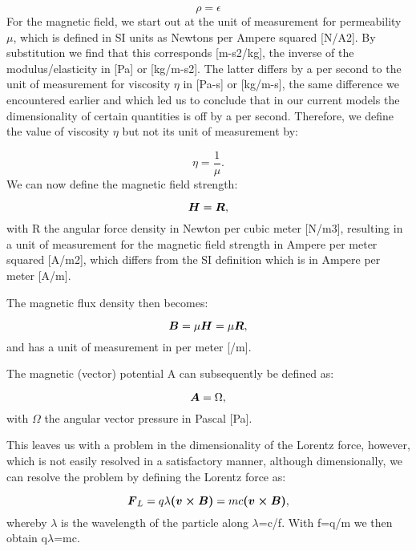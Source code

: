 \documentclass{article}
\newcommand\boldsubformula[1]{\text{\mathversion{bold}$#1$}}
\begin{document}
\begin{equation}
\rho =\epsilon 
\end{equation}
For the magnetic field, we start out at the unit of measurement for permeability $\mu $, which is defined in SI units as
Newtons per Ampere squared [N/A2]. By substitution we find that this corresponds [m-s2/kg], the inverse of the
modulus/elasticity in [Pa] or [kg/m-s2]. The latter differs by a per second to the unit of measurement for viscosity
$\eta $ in [Pa-s] or [kg/m-s], the same difference we encountered earlier and which led us to conclude that in our
current models the dimensionality of certain quantities is off by a per second. Therefore, we define the value of
viscosity $\eta $ but not its unit of measurement by:

\begin{equation}
\eta =\frac 1{\mu }.
\end{equation}
We can now define the magnetic field strength:

\begin{equation}
\boldsubformula H=\boldsubformula R,
\end{equation}
with R the angular force density in Newton per cubic meter [N/m3], resulting in a unit of measurement for the magnetic
field strength in Ampere per meter squared [A/m2], which differs from the SI definition which is in Ampere per meter
[A/m]. 

The magnetic flux density then becomes:

\begin{equation}
\boldsubformula B=\mu \boldsubformula H=\mu \boldsubformula R,
\end{equation}
and has a unit of measurement in per meter [/m].

The magnetic (vector) potential A can subsequently be defined as:

\begin{equation}
\boldsubformula A=\Omega ,
\end{equation}
with $\Omega $ the angular vector pressure in Pascal [Pa].

This leaves us with a problem in the dimensionality of the Lorentz force, however, which is not easily resolved in a
satisfactory manner, although dimensionally, we can resolve the problem by defining the Lorentz force as:

\begin{equation}
\boldsubformula F_L=q\lambda \boldsubformula{(v\times B)}=mc\boldsubformula{(v\times \boldsubformula B)},
\end{equation}
whereby $\lambda $ is the wavelength of the particle along $\lambda $=c/f. With f=q/m we then obtain q$\lambda $=mc.
\end{document}
